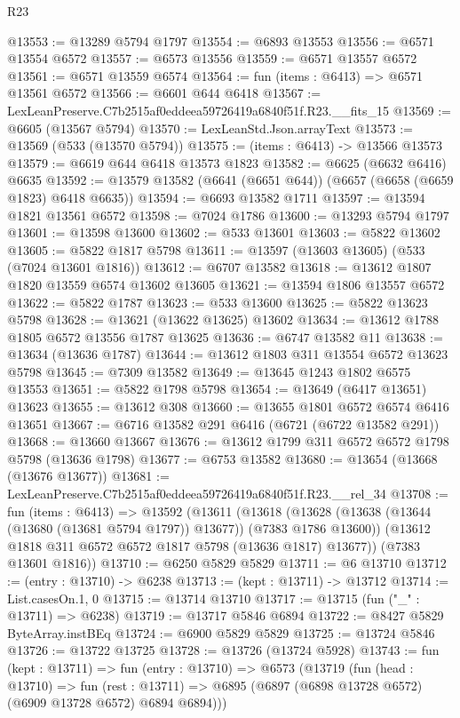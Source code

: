 \begin{lexlean}{R23}
\begin{coremodule}
@13553 := @13289 @5794 @1797
@13554 := @6893 @13553
@13556 := @6571 @13554 @6572
@13557 := @6573 @13556
@13559 := @6571 @13557 @6572
@13561 := @6571 @13559 @6574
@13564 := fun (items : @6413) => @6571 @13561 @6572
@13566 := @6601 @644 @6418
@13567 := LexLeanPreserve.C7b2515af0eddeea59726419a6840f51f.R23.__fits_15
@13569 := @6605 (@13567 @5794)
@13570 := LexLeanStd.Json.arrayText
@13573 := @13569 (@533 (@13570 @5794))
@13575 := (items : @6413) -> @13566 @13573
@13579 := @6619 @644 @6418 @13573 @1823
@13582 := @6625 (@6632 @6416) @6635
@13592 := @13579 @13582 (@6641 (@6651 @644)) (@6657 (@6658 (@6659 @1823) @6418 @6635))
@13594 := @6693 @13582 @1711
@13597 := @13594 @1821 @13561 @6572
@13598 := @7024 @1786
@13600 := @13293 @5794 @1797
@13601 := @13598 @13600
@13602 := @533 @13601
@13603 := @5822 @13602
@13605 := @5822 @1817 @5798
@13611 := @13597 (@13603 @13605) (@533 (@7024 @13601 @1816))
@13612 := @6707 @13582
@13618 := @13612 @1807 @1820 @13559 @6574 @13602 @13605
@13621 := @13594 @1806 @13557 @6572
@13622 := @5822 @1787
@13623 := @533 @13600
@13625 := @5822 @13623 @5798
@13628 := @13621 (@13622 @13625) @13602
@13634 := @13612 @1788 @1805 @6572 @13556 @1787 @13625
@13636 := @6747 @13582 @11
@13638 := @13634 (@13636 @1787)
@13644 := @13612 @1803 @311 @13554 @6572 @13623 @5798
@13645 := @7309 @13582
@13649 := @13645 @1243 @1802 @6575 @13553
@13651 := @5822 @1798 @5798
@13654 := @13649 (@6417 @13651) @13623
@13655 := @13612 @308
@13660 := @13655 @1801 @6572 @6574 @6416 @13651
@13667 := @6716 @13582 @291 @6416 (@6721 (@6722 @13582 @291))
@13668 := @13660 @13667
@13676 := @13612 @1799 @311 @6572 @6572 @1798 @5798 (@13636 @1798)
@13677 := @6753 @13582
@13680 := @13654 (@13668 (@13676 @13677))
@13681 := LexLeanPreserve.C7b2515af0eddeea59726419a6840f51f.R23.__rel_34
@13708 := fun (items : @6413) =>
  @13592
    (@13611
      (@13618
        (@13628 (@13638 (@13644 (@13680 (@13681 @5794 @1797)) @13677)) (@7383 @1786 @13600))
        (@13612 @1818 @311 @6572 @6572 @1817 @5798 (@13636 @1817) @13677))
      (@7383 @13601 @1816))
@13710 := @6250 @5829 @5829
@13711 := @6 @13710
@13712 := (entry : @13710) -> @6238
@13713 := (kept : @13711) -> @13712
@13714 := List.casesOn.{1, 0}
@13715 := @13714 @13710
@13717 := @13715 (fun ("_" : @13711) => @6238)
@13719 := @13717 @5846 @6894
@13722 := @8427 @5829 ByteArray.instBEq
@13724 := @6900 @5829 @5829
@13725 := @13724 @5846
@13726 := @13722 @13725
@13728 := @13726 (@13724 @5928)
@13743 := fun (kept : @13711) =>
  fun (entry : @13710) =>
  @6573
    (@13719
      (fun (head : @13710) =>
      fun (rest : @13711) => @6895 (@6897 (@6898 @13728 @6572) (@6909 @13728 @6572) @6894 @6894)))

\end{coremodule}
\end{lexlean}
